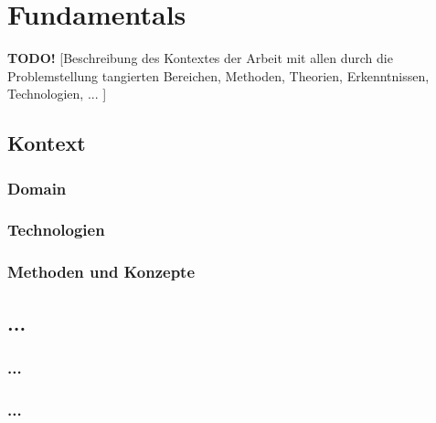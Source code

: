 \chapter{Fundamentals}

\textbf{TODO!} 
[Beschreibung des Kontextes der Arbeit mit allen durch die Problemstellung tangierten Bereichen, Methoden, Theorien, Erkenntnissen, Technologien, ... ] 


\section{Kontext}


\subsection{Domain} 



\subsection{Technologien}


\subsection{Methoden und Konzepte}


\section{...}


\subsection{...}


\subsection{...}
